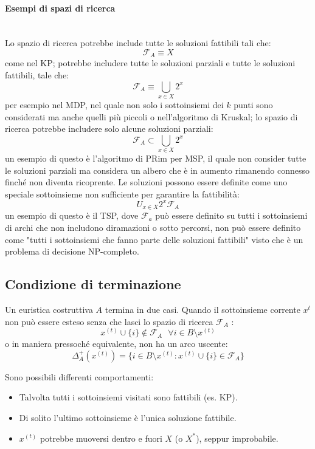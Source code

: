 \documentclass{article}
\begin{document}
    \paragraph{Esempi di spazi di ricerca}\mbox{}\\
    Lo spazio di ricerca potrebbe include tutte le soluzioni fattibili tali che:
    $$\mathcal{F}_A\equiv X$$
    come nel KP; potrebbe includere tutte le soluzioni parziali e tutte le soluzioni fattibili, tale che:
    $$\mathcal{F}_A\equiv \bigcup_{x\in X} 2^x$$
    per esempio nel MDP, nel quale non solo i sottoinsiemi dei $k$ punti sono considerati ma anche
    quelli più piccoli o nell'algoritmo di Kruskal; lo spazio di ricerca potrebbe includere solo
    alcune soluzioni parziali:
    $$\mathcal{F}_A\subset \bigcup_{x\in X} 2^x$$
    un esempio di questo è l'algoritmo di PRim per MSP, il quale non consider tutte le soluzioni
    parziali ma considera un albero che è in aumento rimanendo connesso finché non diventa ricoprente.
    Le soluzioni possono essere definite come uno speciale sottoinsieme non sufficiente per garantire
    la fattibilità:
    $$ U_{x\in X}2^x \mathcal{F}_A$$
    un esempio di questo è il TSP, dove $\mathcal{F}_a$ può essere definito su tutti i
    sottoinsiemi di archi che non includono diramazioni o sotto percorsi, non può
    essere definito come "tutti i sottoinsiemi che fanno parte delle soluzioni fattibili"
    visto che è un problema di decisione NP-completo.

    \subsection{Condizione di terminazione}
    Un euristica costruttiva $A$ termina in due casi. Quando il sottoinsieme corrente $x^{t}$
    non può essere esteso senza che lasci lo spazio di ricerca $\mathcal{F}_A$ :
    $$x^{(t)}\cup\{i\}\notin\mathcal{F}_A\text{   }\forall i\in B\setminus x^{(t)}$$
    o in maniera pressoché equivalente, non ha un arco uscente:
    $$\Delta_A^+(x^{(t)})=\{i\in B\setminus x^{(t)}:x^{(t)}\cup\{i\}\in\mathcal{F}_A\}$$

    Sono possibili differenti comportamenti:
    \begin{itemize}
        \item Talvolta tutti i sottoinsiemi visitati sono fattibili (es. KP).
        \item Di solito l'ultimo sottoinsieme è l'unica soluzione fattibile.
        \item $x^{(t)}$ potrebbe muoversi dentro e fuori $X$ (o $X^*$), seppur improbabile.
    \end{itemize}
\end{document}

